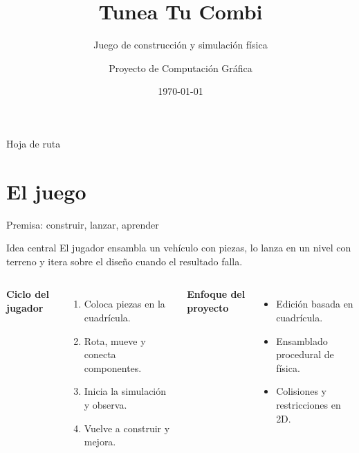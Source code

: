 \documentclass[aspectratio=169,11pt]{beamer}
\title[Tunea Tu Combi]{Tunea Tu Combi}
\subtitle{Juego de construcción y simulación física}
\author{Proyecto de Computación Gráfica}
\institute{Universidad de Ingeniería y Tecnología (UTEC)}
\date{\today}
\begin{document}
\begin{frame}
  \titlepage
\end{frame}

\begin{frame}{Hoja de ruta}
  \tableofcontents[hideallsubsections]
\end{frame}

\section{El juego}

\begin{frame}{Premisa: construir, lanzar, aprender}
  \begin{block}{Idea central}
    El jugador ensambla un vehículo con piezas, lo lanza en un nivel con
    terreno y itera sobre el diseño cuando el resultado falla.
  \end{block}

  \vspace{0.2cm}
  \begin{columns}[T]
    \textbf{Ciclo del jugador}
    \begin{enumerate}[label=\arabic*.]
      \item Coloca piezas en la cuadrícula.
      \item Rota, mueve y conecta componentes.
      \item Inicia la simulación y observa.
      \item Vuelve a construir y mejora.
    \end{enumerate}
    \textbf{Enfoque del proyecto}
    \begin{itemize}
      \item Edición basada en cuadrícula.
      \item Ensamblado procedural de física.
      \item Colisiones y restricciones en 2D.
    \end{itemize}
  \end{columns}
\end{frame}
\end{document}
